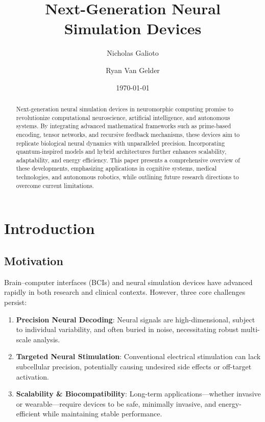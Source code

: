\documentclass{article}
\theoremstyle{plain}
\begin{document}
\title{Next-Generation Neural Simulation Devices}

\author[1]{Nicholas Galioto}
\author[2]{Ryan Van Gelder}
\date{\today}
\maketitle
\begin{abstract}
Next-generation neural simulation devices in neuromorphic computing promise to revolutionize computational neuroscience, artificial intelligence, and autonomous systems. By integrating advanced mathematical frameworks such as prime-based encoding, tensor networks, and recursive feedback mechanisms, these devices aim to replicate biological neural dynamics with unparalleled precision. Incorporating quantum-inspired models and hybrid architectures further enhances scalability, adaptability, and energy efficiency. This paper presents a comprehensive overview of these developments, emphasizing applications in cognitive systems, medical technologies, and autonomous robotics, while outlining future research directions to overcome current limitations.
\end{abstract}
\section{Introduction}

\subsection{Motivation}
Brain–computer interfaces (BCIs) and neural simulation devices have advanced rapidly in both research and clinical contexts. However, three core challenges persist:
\begin{enumerate}
    \item \textbf{Precision Neural Decoding}: Neural signals are high-dimensional, subject to individual variability, and often buried in noise, necessitating robust multi-scale analysis.
    \item \textbf{Targeted Neural Stimulation}: Conventional electrical stimulation can lack subcellular precision, potentially causing undesired side effects or off-target activation.
    \item \textbf{Scalability \& Biocompatibility}: Long-term applications—whether invasive or wearable—require devices to be safe, minimally invasive, and energy-efficient while maintaining stable performance.
\end{enumerate}
\end{document}
